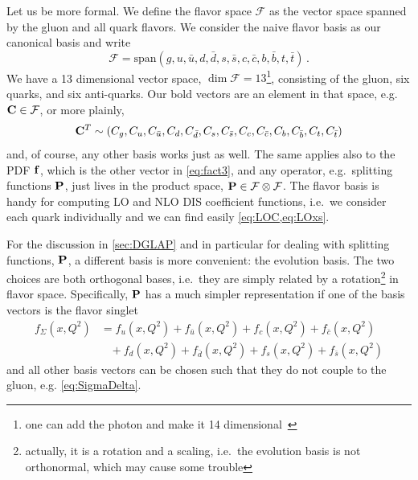 Let us be more formal.
We define the flavor space $\mathcal F$ as the vector space spanned by the gluon and all quark flavors.
We consider the naive flavor basis as our canonical basis and write
\begin{equation}
    \mathcal F = \mathrm{span}(g, u, \bar u, d, \bar d, s, \bar s, c, \bar c, b, \bar b, t, \bar t)\,. \label{eq:flspace}
\end{equation}
We have a 13 dimensional vector space, $\dim{\mathcal F} = 13$\footnote{one can add the photon and make it 14 dimensional~\cite{NNPDF:2024djq}}, consisting of the gluon, six quarks, and six anti-quarks.
Our bold vectors are an element in that space, e.g.\ $\vb C \in \mathcal F$, or more plainly,
\begin{equation}
    \vb C^T \sim (C_g, C_u, C_{\bar u}, C_d, C_{\bar d}, C_s, C_{\bar s}, C_c, C_{\bar c}, C_b, C_{\bar b}, C_t, C_{\bar t})
\end{equation}
and, of course, any other basis works just as well.
The same applies also to the PDF $\vb f$, which is the other vector in \cref{eq:fact3}, and any operator, e.g.\ splitting functions $\vb P$, just lives in the product space, $\vb P \in \mathcal F \otimes \mathcal F$.
The flavor basis is handy for computing LO and NLO DIS coefficient functions, i.e.\ we consider each quark individually and we can find easily \cref{eq:LOC,eq:LOxs}.

For the discussion in \cref{sec:DGLAP} and in particular for dealing with splitting functions, $\vb P$, a different basis is more convenient: the evolution basis.
The two choices are both orthogonal bases, i.e.\ they are simply related by a rotation\footnote{actually, it is a rotation and a scaling, i.e.\ the evolution basis is not orthonormal, which may cause some trouble} in flavor space.
Specifically, $\vb P$ has a much simpler representation if one of the basis vectors is the flavor singlet
\begin{align}
    f_\Sigma(x,Q^2) &= f_u(x,Q^2) + f_{\bar u}(x,Q^2) + f_c(x,Q^2) + f_{\bar c}(x,Q^2)\nonumber\\
    & \hspace{10pt} + f_d(x,Q^2) + f_{\bar d}(x,Q^2) + f_s(x,Q^2) + f_{\bar s}(x,Q^2) \label{eq:Singlet}
\end{align}
and all other basis vectors can be chosen such that they do not couple to the gluon, e.g. \cref{eq:SigmaDelta}.


